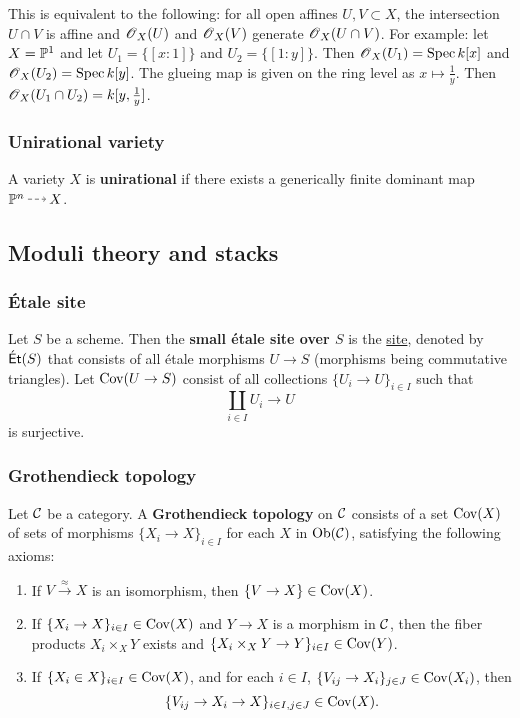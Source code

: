 \documentclass[11pt, english]{article}
\begin{document}
This is equivalent to the following: for all open affines $U,V \subset X$, the intersection $U \cap V$ is affine and $\operatorname{\mathscr{O}}_X(U)$ and $\operatorname{\mathscr{O}}_X(V)$ generate $\operatorname{\mathscr{O}}_X(U \cap V)$. For example: let $X=\mathbb{P}^1$ and let $U_1=\{ [x:1] \}$ and $U_2= \{ [1:y] \}$. Then $\operatorname{\mathscr{O}}_X(U_1)=\operatorname{Spec} k[x]$ and $\operatorname{\mathscr{O}}_X(U_2)=\operatorname{Spec} k[y]$. The glueing map is given on the ring level as $x \mapsto \frac 1y$. Then $\operatorname{\mathscr{O}}_X(U_1 \cap U_2) = k[y,\frac 1y]$. 

\subsubsection{Unirational variety}
\label{unirational}

A variety $X$ is \textbf{unirational} if there exists a generically finite dominant map $\PP^n \rmap X$. 

\subsection{Moduli theory and stacks} 

\subsubsection{Étale site}
\label{etalesite}

Let $S$ be a scheme. Then the \textbf{small étale site over $S$} is the \hyperref[site]{site}, denoted by $\mathsf{\acute{E}t}(S)$ that consists of all étale morphisms $U \to S$ (morphisms being commutative triangles). Let $\operatorname{Cov}(U \to S)$ consist of all collections $\{ U_i \to U \}_{i \in I}$ such that
\[
\coprod_{i \in I} U_i \to U
\]
is surjective.

\subsubsection{Grothendieck topology}
\label{grothendiecktopology}

Let $\mathcal{C}$ be a category. A \textbf{Grothendieck topology} on $\mathcal{C}$ consists of a set $\operatorname{Cov}(X)$ of sets of morphisms $\{ X_i \to X\}_{i \in I}$ for each $X$ in $\mathrm{Ob}(\mathcal{C})$, satisfying the following axioms:
\begin{enumerate}
\item If $V \xrightarrow{\approx} X$ is an isomorphism, then $\{ V \to X\} \in \operatorname{Cov}(X)$.
\item If $\{X_i \to X\}_{i \in I} \in \operatorname{Cov}(X)$ and $Y \to X$ is a morphism in $\mathcal{C}$, then the fiber products $X_i \times_X Y$ exists and ${\{ X_i \times_X Y \to Y\}_{i \in I} \in \operatorname{Cov}(Y)}$.
\item If $\{X_i \in X\}_{i \in I} \in \operatorname{Cov}(X)$, and for each $i \in I$, $\{ V_{ij} \to X_i\}_{j \in J} \in  \operatorname{Cov}(X_i)$, then
\[
\{ V_{ij} \to X_i \to X\}_{i \in I, j \in J} \in \operatorname{Cov}(X).
\]
\end{enumerate}
\end{document}
